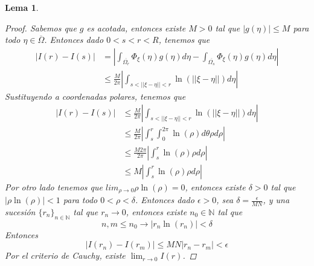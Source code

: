 \documentclass[11pt]{book}
\theoremstyle{plain}
\newtheorem{lema}[proposición]{Lema}
\theoremstyle{definition}
\newcommand{\N}{\mathbb{N}}
\begin{document}
\begin{lema}
\begin{proof}
            Sabemos que $g$ es acotada, entonces existe $M > 0$ tal que $|g(\eta)| \leq M$ para todo $\eta \in \overline{\Omega}$. Entonces dado $0 < s < r < R$, tenemos que
            \begin{align*}
                \left|I(r) - I(s)\right| &= \left|\int_{\overline{\Omega_{r}}} \Phi_{\xi}(\eta)g(\eta) d\eta - \int_{\overline{\Omega_{s}}} \Phi_{\xi}(\eta)g(\eta) d\eta\right|\\
                &\leq \frac{M}{2\pi}\left|\int_{s < ||\xi - \eta|| < r} \ln(||\xi - \eta||) d\eta\right|
            \end{align*}
            Sustituyendo a coordenadas polares, tenemos que
            \begin{align*}
                \left|I(r) - I(s)\right| &\leq \frac{M}{2\pi}\left|\int_{s < ||\xi - \eta|| < r} \ln(||\xi - \eta||) d\eta\right|\\
                &\leq \frac{M}{2\pi}\left|\int_{s}^{r} \int_{0}^{2\pi} \ln(\rho) d\theta \rho d\rho\right|\\
                &\leq \frac{M 2\pi}{2\pi}\left|\int_{s}^{r} \ln(\rho) \rho d\rho\right|\\
                &\leq M\left|\int_{s}^{r} \ln(\rho) \rho d\rho\right|
            \end{align*}
            Por otro lado tenemos que $lim_{\rho \to 0} \rho \ln(\rho) = 0$, entonces existe $\delta > 0$ tal que $|\rho \ln(\rho)| < 1$ para todo $0 < \rho < \delta$. Entonces dado $\epsilon > 0$, sea $\delta = \frac{\epsilon}{MN}$, y una sucesión $\{r_{n}\}_{n \in \N}$ tal que $r_{n} \to 0$, entonces existe $n_{0} \in \N$ tal que
            \[
                n,m \leq n_{0} \to |r_{n} \ln(r_{n})| < \delta  
            \]
            Entonces
            \[
                \left| I(r_{n}) - I(r_{m})\right| \leq MN|r_{n} - r_{m}| < \epsilon  
            \]
            Por el criterio de Cauchy, existe $\lim_{r \to 0} I(r)$.
        \end{proof}
    \end{lema}
\end{document}
